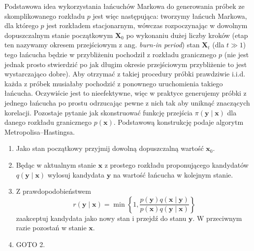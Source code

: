 \documentclass{myclass}
\numberwithin{equation}{subsection}
\begin{document}
Podstawowa idea wykorzystania łańcuchów Markowa do generowania próbek ze skomplikowanego rozkładu
\(p\) jest więc następująca: tworzymy łańcuch Markowa, dla którego \(p\) jest rozkładem
stacjonarnym, wówczas rozpoczynając w dowolnym dopuszczalnym stanie początkowym \(\bm{X}_0\) po
wykonaniu dużej liczby kroków (etap ten nazywamy okresem przejściowym z ang. \textit{burn-in
period}) stan \(\bm{X}_t\) (dla \(t \gg 1\)) tego łańcucha będzie w przybliżeniu pochodził z
rozkładu granicznego \(p\) (nie jest jednak prosto stwierdzić po jak długim okresie przejściowym
przybliżenie to jest wystarczająco dobre). Aby otrzymać z takiej procedury próbki prawdziwie i.i.d.
każda z próbek musiałaby pochodzić z ponownego uruchomienia takiego łańcucha. Oczywiście jest to
nieefektywne, więc w praktyce generujemy próbki z jednego łańcucha po prostu odrzucając pewne z nich
tak aby uniknąć znaczących korelacji. Pozostaje pytanie jak skonstruować funkcję przejścia
\(\pi(\bm{y} \mid \bm{x})\) dla danego rozkładu granicznego \(p(\bm{x})\). Podstawową konstrukcję
podaje algorytm Metropolisa--Hastingsa.
\begin{tcolorbox}[title=Algorytm Metropolisa--Hastingsa, breakable, boxrule=0pt]
\begin{enumerate}
\item Jako stan początkowy przyjmij dowolną dopuszczalną wartość \(\bm{x}_0\).

\item Będąc w aktualnym stanie \(\bm{x}\) z prostego rozkładu proponującego kandydatów \(q(\bm{y}
\mid \bm{x})\) wylosuj kandydata \(\bm{y}\) na wartość łańcucha w kolejnym stanie.

\item Z prawdopodobieństwem
\[
r(\bm{y} \mid \bm{x}) = \min\left\{1, \frac{p(\bm{y})q(\bm{x} \mid \bm{y})}{p(\bm{x})q(\bm{y} \mid \bm{x})}\right\}
\]
zaakceptuj kandydata jako nowy stan i przejdź do stanu \(\bm{y}\). W przeciwnym razie pozostań w
stanie \(\bm{x}\).

\item GOTO 2.
\end{enumerate}
\end{tcolorbox}
\end{document}
